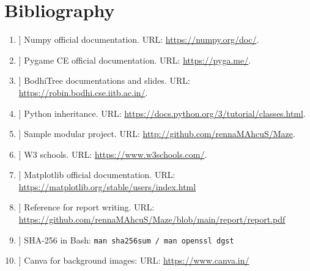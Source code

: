 \documentclass[12pt]{article}
\begin{document}
\section{Bibliography}
\begin{enumerate}
    \item[[1]] Numpy official documentation. URL: \url{https://numpy.org/doc/}.
    \item[[2]] Pygame CE official documentation. URL: \url{https://pyga.me/}.
    \item[[3]] BodhiTree documentations and slides. URL: \url{https://robin.bodhi.cse.iitb.ac.in/}.
    \item[[4]] Python inheritance. URL: \url{https://docs.python.org/3/tutorial/classes.html}.
    \item[[5]] Sample modular project. URL: \url{http://github.com/rennaMAhcuS/Maze}.
    \item[[6]] W3 schools. URL: \url{https://www.w3schools.com/}.
    \item[[7]] Matplotlib official documentation. URL:
    \url{https://matplotlib.org/stable/users/index.html}
    \item[[8]] Reference for report writing. URL:
\url{https://github.com/rennaMAhcuS/Maze/blob/main/report/report.pdf}
    \item[[9]] SHA-256 in Bash: \texttt{man sha256sum / man openssl dgst}
    \item[[10]] Canva for background images: URL:
    \url{https://www.canva.in/}

\end{enumerate}
\end{document}
